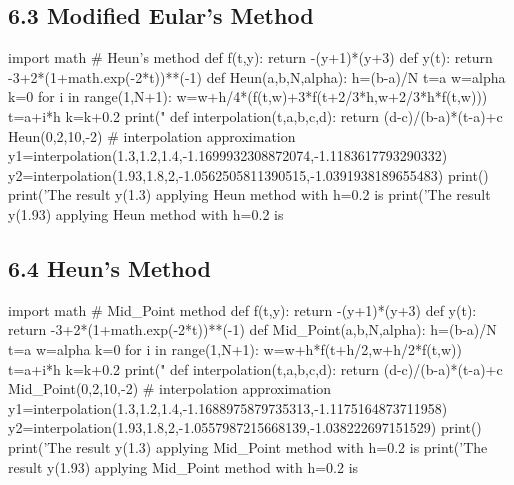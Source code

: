 \documentclass{article}
\begin{document}
\subsection{6.3 Modified Eular's Method} 
\begin{python}
import math
# Heun's method
def f(t,y):
    return -(y+1)*(y+3)
def y(t):
    return -3+2*(1+math.exp(-2*t))**(-1)
def Heun(a,b,N,alpha):
    h=(b-a)/N
    t=a
    w=alpha
    k=0
    for i in range(1,N+1):
        w=w+h/4*(f(t,w)+3*f(t+2/3*h,w+2/3*h*f(t,w)))
        t=a+i*h
        k=k+0.2
        print("%
def interpolation(t,a,b,c,d):
    return (d-c)/(b-a)*(t-a)+c
Heun(0,2,10,-2)
# interpolation approximation 
y1=interpolation(1.3,1.2,1.4,-1.1699932308872074,-1.1183617793290332)
y2=interpolation(1.93,1.8,2,-1.0562505811390515,-1.0391938189655483)
print()
print('The result y(1.3) applying Heun method with h=0.2 is %
print('The result y(1.93) applying Heun method with h=0.2 is %
\end{python}

\subsection{6.4 Heun's Method}
\begin{python}
import math
# Mid_Point method
def f(t,y):
    return -(y+1)*(y+3)
def y(t):
    return -3+2*(1+math.exp(-2*t))**(-1)
def Mid_Point(a,b,N,alpha):
    h=(b-a)/N
    t=a
    w=alpha
    k=0
    for i in range(1,N+1):
        w=w+h*f(t+h/2,w+h/2*f(t,w))
        t=a+i*h
        k=k+0.2
        print("%
def interpolation(t,a,b,c,d):
    return (d-c)/(b-a)*(t-a)+c
Mid_Point(0,2,10,-2)
# interpolation approximation 
y1=interpolation(1.3,1.2,1.4,-1.1688975879735313,-1.1175164873711958)
y2=interpolation(1.93,1.8,2,-1.0557987215668139,-1.038222697151529)
print()
print('The result y(1.3) applying Mid_Point method with h=0.2 is %
print('The result y(1.93) applying Mid_Point method with h=0.2 is %
\end{python}
\end{document}
